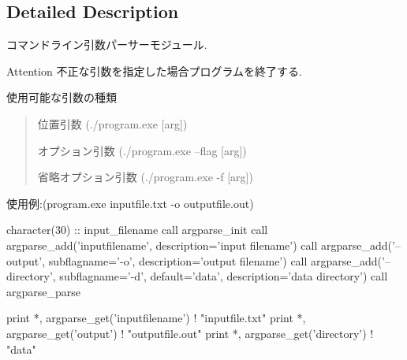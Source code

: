 \subsection{Detailed Description}
コマンドライン引数パーサーモジュール. 

\begin{DoxyAttention}{Attention}
不正な引数を指定した場合プログラムを終了する.
\end{DoxyAttention}
使用可能な引数の種類 \begin{quotation}

\begin{DoxyItemize}
\item 位置引数 (./program.exe \mbox{[}arg\mbox{]})
\item オプション引数 (./program.exe --flag \mbox{[}arg\mbox{]})
\item 省略オプション引数 (./program.exe -\/f \mbox{[}arg\mbox{]})
\end{DoxyItemize}

\end{quotation}


使用例\-:(program.\-exe inputfile.\-txt -\/o outputfile.\-out) 
\begin{DoxyCode}
\textcolor{comment}{character(30) :: input\_filename}
\textcolor{comment}{call argparse\_init}
\textcolor{comment}{call argparse\_add('inputfilename', description='input filename')}
\textcolor{comment}{call argparse\_add('--output', subflagname='-o', description='output filename')}
\textcolor{comment}{call argparse\_add('--directory', subflagname='-d', default='data', description='data directory')}
\textcolor{comment}{call argparse\_parse}

print *, argparse\_get(\textcolor{stringliteral}{'inputfilename'})  \textcolor{comment}{! "inputfile.txt"}
print *, argparse\_get(\textcolor{stringliteral}{'output'})  \textcolor{comment}{! "outputfile.out"}
print *, argparse\_get(\textcolor{stringliteral}{'directory'}) ! \textcolor{stringliteral}{"data"}
\end{DoxyCode}
 

